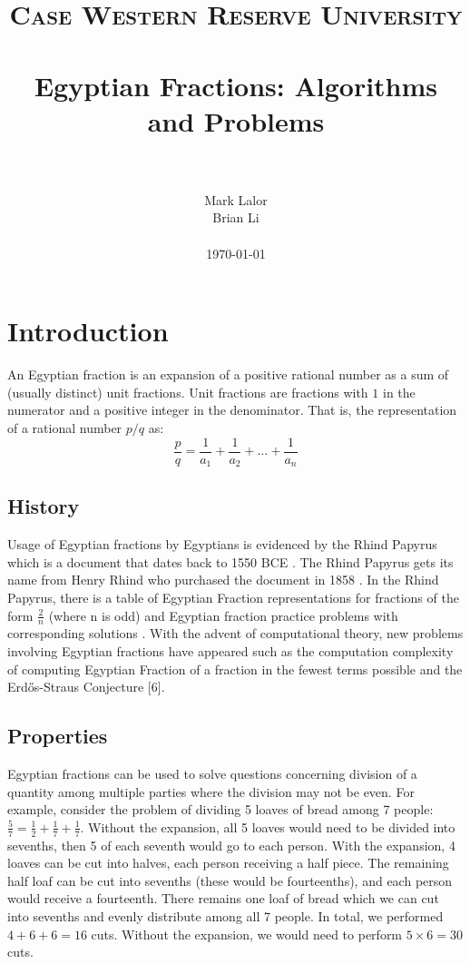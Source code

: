 \documentclass[paper=a4, fontsize=11pt]{scrartcl}
\title{
		\usefont{OT1}{bch}{b}{n}
		\normalfont \normalsize \textsc{Case Western Reserve University} \\ [25pt]
		\horrule{0.5pt} \\[0.4cm]
		\huge Egyptian Fractions: Algorithms and Problems \\
		\horrule{2pt} \\[0.5cm]
}
\author{
		\normalfont 			\normalsize
        Mark Lalor\\[-3pt]		\normalsize
        Brian Li\\[-3pt]		\normalsize
        \\
        \today
}
\date{}
\numberwithin{equation}{section}	 %
\numberwithin{figure}{section}	 %
\numberwithin{table}{section}	 %
\begin{document}
\maketitle
\section{Introduction}
An Egyptian fraction is an expansion of a positive rational number as a sum of (usually distinct) unit fractions. Unit fractions are fractions with $1$ in the numerator and a positive integer in the denominator. That is, the representation of a rational number $p/q$ as:
\begin{equation}
	\frac{p}{q} = \frac{1}{a_1} + \frac{1}{a_2} + \ldots + \frac{1}{a_n}
\end{equation}
\subsection{History}
Usage of Egyptian fractions by Egyptians is evidenced by the Rhind Papyrus which is a document that dates back to 1550 BCE \cite{imhausen}. The Rhind Papyrus gets its name from Henry Rhind who purchased the document in 1858 \cite{imhausen}. In the Rhind Papyrus, there is a table of Egyptian Fraction representations for fractions of the form $\frac{2}{n}$ (where n is odd) and Egyptian fraction practice problems with corresponding solutions \cite{imhausen}. With the advent of computational theory, new problems involving Egyptian fractions have appeared such as the computation complexity of computing Egyptian Fraction of a fraction in the fewest terms possible and the Erd\H{o}s-Straus Conjecture [6].
\subsection{Properties}
Egyptian fractions can be used to solve questions concerning division of a quantity among multiple parties where the division may not be even. For example, consider the problem of dividing 5 loaves of bread among 7 people: $\frac{5}{7} = \frac{1}{2} + \frac{1}{7} + \frac{1}{7}$. Without the expansion, all 5 loaves would need to be divided into sevenths, then 5 of each seventh would go to each person. With the expansion, 4 loaves can be cut into halves, each person receiving a half piece. The remaining half loaf can be cut into sevenths (these would be fourteenths), and each person would receive a fourteenth. There remains one loaf of bread which we can cut into sevenths and evenly distribute among all 7 people. In total, we performed $4 + 6 + 6 = 16$ cuts. Without the expansion, we would need to perform $5 \times 6 = 30$ cuts.
\end{document}
